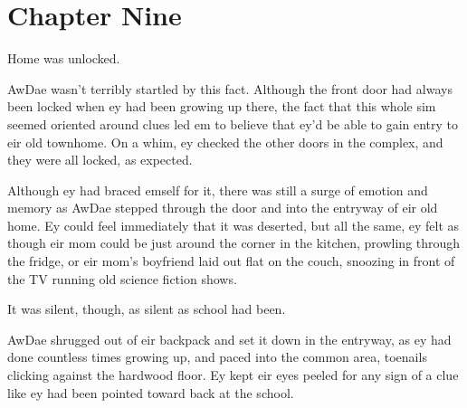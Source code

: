 \chapter*{Chapter Nine}

Home was unlocked.

AwDae wasn't terribly startled by this fact.  Although the front door had always been locked when ey had been growing up there, the fact that this whole sim seemed oriented around clues led em to believe that ey'd be able to gain entry to eir old townhome.  On a whim, ey checked the other doors in the complex, and they were all locked, as expected.

Although ey had braced emself for it, there was still a surge of emotion and memory as AwDae stepped through the door and into the entryway of eir old home.  Ey could feel immediately that it was deserted, but all the same, ey felt as though eir mom could be just around the corner in the kitchen, prowling through the fridge, or eir mom's boyfriend laid out flat on the couch, snoozing in front of the TV running old science fiction shows.

It was silent, though, as silent as school had been.

AwDae shrugged out of eir backpack and set it down in the entryway, as ey had done countless times growing up, and paced into the common area, toenails clicking against the hardwood floor.  Ey kept eir eyes peeled for any sign of a clue like ey had been pointed toward back at the school.
